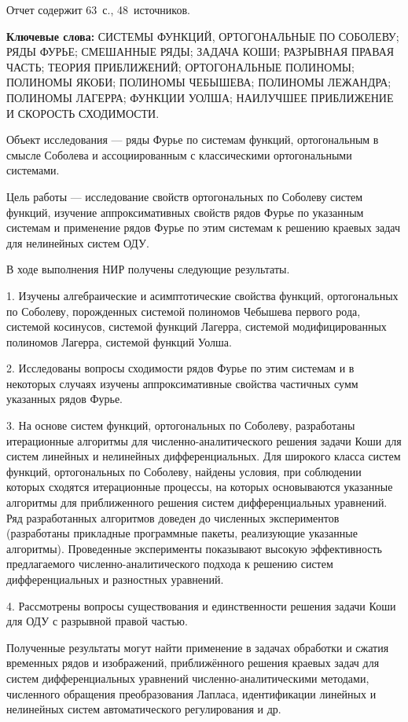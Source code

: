 \Referat %

Отчет содержит 63~с., 48~источников.

 \bigskip
 \textbf{ Ключевые
  слова:}
  СИСТЕМЫ ФУНКЦИЙ, ОРТОГОНАЛЬНЫЕ ПО СОБОЛЕВУ; РЯДЫ ФУРЬЕ; СМЕШАННЫЕ РЯДЫ; ЗАДАЧА КОШИ; РАЗРЫВНАЯ ПРАВАЯ ЧАСТЬ;
  ТЕОРИЯ ПРИБЛИЖЕНИЙ; ОРТОГОНАЛЬНЫЕ ПОЛИНОМЫ; ПОЛИНОМЫ ЯКОБИ; ПОЛИНОМЫ ЧЕБЫШЕВА; ПОЛИНОМЫ ЛЕЖАНДРА; ПОЛИНОМЫ ЛАГЕРРА; ФУНКЦИИ УОЛША; НАИЛУЧШЕЕ ПРИБЛИЖЕНИЕ И СКОРОСТЬ СХОДИМОСТИ.

 \bigskip

Объект исследования --- ряды Фурье по системам функций, ортогональным в смысле Соболева и ассоциированным с классическими ортогональными системами.

Цель работы --- исследование свойств ортогональных по Соболеву систем функций, изучение аппроксимативных свойств рядов Фурье по указанным системам и применение рядов Фурье по этим системам к решению краевых задач для нелинейных систем ОДУ.

В ходе выполнения НИР получены следующие результаты. 

1. Изучены алгебраические и асимптотические свойства функций, ортогональных по Соболеву, порожденных системой полиномов Чебышева первого рода, системой косинусов, системой функций Лагерра, системой модифицированных полиномов Лагерра, системой функций Уолша. 

2. Исследованы вопросы сходимости рядов Фурье по этим системам и в некоторых случаях изучены аппроксимативные свойства частичных сумм указанных рядов Фурье.

3. На основе систем функций, ортогональных по Соболеву, разработаны итерационные алгоритмы для численно-аналитического решения задачи Коши для систем линейных и нелинейных дифференциальных. Для широкого класса систем функций, ортогональных по Соболеву, найдены условия, при соблюдении которых сходятся итерационные процессы, на которых основываются указанные алгоритмы для приближенного решения систем дифференциальных уравнений.
Ряд разработанных алгоритмов доведен до численных экспериментов (разработаны прикладные программные пакеты, реализующие указанные алгоритмы).
Проведенные эксперименты показывают высокую эффективность предлагаемого численно-аналитического подхода к решению систем дифференциальных и разностных уравнений.

4. Рассмотрены вопросы существования и единственности решения задачи Коши для ОДУ с разрывной правой частью.
  
Полученные результаты могут найти применение в задачах обработки и сжатия временных рядов и изображений, приближённого решения краевых задач для систем дифференциальных уравнений численно-аналитическими методами, численного обращения преобразования Лапласа, идентификации линейных и нелинейных систем автоматического регулирования и др.
